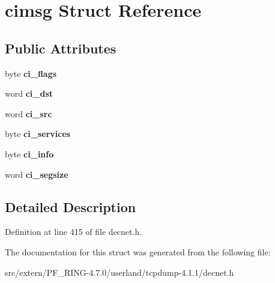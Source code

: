 \hypertarget{structcimsg}{
\section{cimsg Struct Reference}
\label{structcimsg}
}
\subsection*{Public Attributes}
\begin{DoxyCompactItemize}
\item 
\hypertarget{structcimsg_a43aa56c104dcfcb0bbcc36b728142678}{
byte {\bfseries ci\_\-flags}}
\label{structcimsg_a43aa56c104dcfcb0bbcc36b728142678}

\item 
\hypertarget{structcimsg_a7b281fc234e6adb9f1b2ee71c01ea4a2}{
word {\bfseries ci\_\-dst}}
\label{structcimsg_a7b281fc234e6adb9f1b2ee71c01ea4a2}

\item 
\hypertarget{structcimsg_ad476acf3539c114739a9c359f40bef35}{
word {\bfseries ci\_\-src}}
\label{structcimsg_ad476acf3539c114739a9c359f40bef35}

\item 
\hypertarget{structcimsg_a9b24e8363b8ff980dc0efe879172836d}{
byte {\bfseries ci\_\-services}}
\label{structcimsg_a9b24e8363b8ff980dc0efe879172836d}

\item 
\hypertarget{structcimsg_ae7a3be5a3036a84ddadfc538f1670295}{
byte {\bfseries ci\_\-info}}
\label{structcimsg_ae7a3be5a3036a84ddadfc538f1670295}

\item 
\hypertarget{structcimsg_a94f28d802525229e3d1f9de4702dc218}{
word {\bfseries ci\_\-segsize}}
\label{structcimsg_a94f28d802525229e3d1f9de4702dc218}

\end{DoxyCompactItemize}


\subsection{Detailed Description}


Definition at line 415 of file decnet.h.



The documentation for this struct was generated from the following file:\begin{DoxyCompactItemize}
\item 
src/extern/PF\_\-RING-\/4.7.0/userland/tcpdump-\/4.1.1/decnet.h\end{DoxyCompactItemize}
